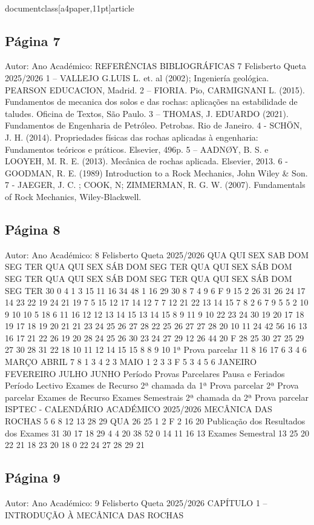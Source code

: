 \\documentclass[a4paper,11pt]{article}
\begin{document}
\subsection*{Página 7}
Autor:
Ano Académico:
REFERÊNCIAS BIBLIOGRÁFICAS
7
Felisberto Queta
2025/2026
1 – VALLEJO G.LUIS L. et. al (2002); Ingeniería geológica. PEARSON EDUCACION, Madrid.
2 – FIORIA. Pio, CARMIGNANI L. (2015). Fundamentos de mecanica dos solos e das rochas: 
aplicações na estabilidade de taludes. Oficina de Textos, São Paulo.
3 – THOMAS, J. EDUARDO (2021). Fundamentos de Engenharia de Petróleo. Petrobas. Rio de 
Janeiro.
4 - SCHÖN, J. H. (2014). Propriedades físicas das rochas aplicadas à engenharia: Fundamentos 
teóricos e práticos. Elsevier, 496p.
5 – AADNØY, B. S. e LOOYEH, M. R. E. (2013). Mecânica de rochas aplicada. Elsevier, 2013.
6 - GOODMAN, R. E. (1989) Introduction to a Rock Mechanics, John Wiley \& Son.
7 - JAEGER, J. C. ; COOK, N; ZIMMERMAN, R. G. W. (2007). Fundamentals of Rock Mechanics, 
Wiley-Blackwell.



\subsection*{Página 8}
Autor:
Ano Académico:
8
Felisberto Queta
2025/2026
QUA
QUI
SEX
SAB
DOM SEG
TER
QUA
QUI
SEX
SÁB DOM SEG
TER
QUA
QUI
SEX
SÁB DOM SEG
TER
QUA
QUI
SEX
SÁB DOM SEG
TER
QUA
QUI
SEX
SÁB DOM SEG
TER
30
0
4
1
3
15
11
16
34
48
1
16
29
30
8
7
4
9
6
F
9
15
2
26
31
26
24
17
14
23
22
19
24
21
19
7
5
15
12
17
14
12
7
7
12
21
22
13
14
15
7
8
2
6
7
9
5
5
2
10
9
10
10
5
18
6
11
16
12
12
13
14
15
13
14
15
8
9
11
9
10
22
23
24
30
19
20
17
18
19
17
18
19
20
21
21
23
24
25
26
27
28
22
25
26
27
27
28
20
10
11
24
42
56
16
13
16
17
21
22
26
19
20
28
24
25
26
30
23
24
27
29
12
26
44
20
F
28
25
30
27
25
29
27
30
28
31
22
18
10
11
12
14
15
15
8
8
9
10
1ª Prova parcelar 
11
8
16
17
6
3
4
6
MARÇO
ABRIL
7
8
1
3
4
2
3
MAIO
1
2
3
3
F
5
3
4
5
6
JANEIRO
FEVEREIRO
JULHO
JUNHO
Período Provas Parcelares
Pausa e Feriados
Período Lectivo
Exames de Recurso
2ª chamada da 1ª Prova parcelar 
2ª Prova parcelar 
Exames de Recurso
Exames Semestrais
2ª chamada da 2ª Prova parcelar 
ISPTEC - CALENDÁRIO  ACADÉMICO 2025/2026  MECÂNICA DAS ROCHAS
5
6
8
12
13
28
29
QUA
26
25
1
2
F
2
16
20
Publicação dos Resultados dos 
Exames
31
30
17
18
29
4
4
20
38
52
0
14
11
16
13
Exames Semestral
13
25
20
22
21
18
23
20
18
0
22
24
27
28
29
21



\subsection*{Página 9}
Autor:
Ano Académico:
9
Felisberto Queta
2025/2026
CAPÍTULO 1 –
INTRODUÇÃO À MECÂNICA 
DAS ROCHAS
\end{document}
